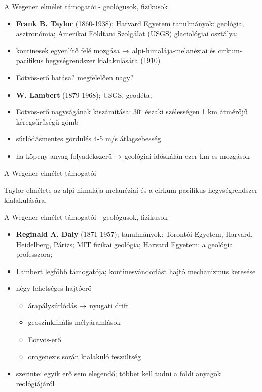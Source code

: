 \documentclass{beamer}
\begin{document}
\begin{frame}{A Wegener elmélet támogatói - geológusok, fizikusok}
    \begin{itemize}
        \item \textbf{Frank B. Taylor} (1860-1938); Harvard Egyetem tanulmányok: geológia, asztronómia; Amerikai Földtani Szolgálat (USGS) glaciológiai osztálya;
        \item kontinesek egyenlítő felé mozgása $\rightarrow$ alpi-himalája-melanéziai és cirkum-pacifikus hegységrendszer kialakulására (1910)
        \item Eötvös-erő hatása? megfelelően nagy?
    \end{itemize}
    
    \begin{itemize}
        \item \textbf{W. Lambert} (1879-1968); USGS, geodéta;
        \item Eötvös-erő nagyságának kiszámítása: 30$^\circ$ északi szélességen 1 km átmérőjű kéregsűrűségű gömb
        \item súrlódásmentes gördülés 4-5 m/s átlagsebesség
        \item ha köpeny anyag folyadékszerű $\rightarrow$ geológiai időskálán ezer km-es mozgások
    \end{itemize}
\end{frame}


\begin{frame}{A Wegener elmélet támogatói}
    \begin{minic}{0.9}
        \centering
        
        Taylor elmélete az alpi-himalája-melanéziai és a cirkum-pacifikus hegységrendszer kialakulására.
    \end{minic}
\end{frame}


\begin{frame}{A Wegener elmélet támogatói - geológusok, fizikusok}
    \begin{itemize}
        \item \textbf{Reginald A. Daly} (1871-1957); tanulmányok: Torontói Egyetem, Harvard, Heidelberg, Párizs; MIT fizikai geológia; Harvard Egyetem: a geológia professzora;
        \item Lambert legfőbb támogatója; kontinesvándorlást hajtó mechanizmus keresése
        \item négy lehetséges hajtóerő
        \begin{itemize}
            \item árapálysúrlódás $\rightarrow$ nyugati drift
            \item geoszinklinális mélyáramlások
            \item Eötvös-erő
            \item orogenezis során kialakuló feszültség
        \end{itemize}
        \item szerinte: egyik erő sem elegendő; többet kell tudni a földi anyagok reológiájáról
    \end{itemize}
\end{frame}
\end{document}
